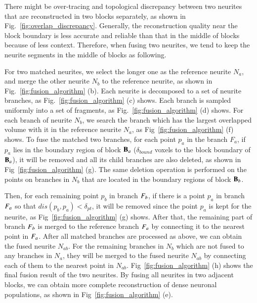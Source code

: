 There might be over-tracing and topological discrepancy between two neurites that are reconstructed in two blocks separately, as shown in Fig.~\ref{fig:overlap_discrepancy}.
Generally, the reconstruction quality near the block boundary is less accurate and reliable than that in the middle of blocks because of less context. 
Therefore, when fusing two neurites, we tend to keep the neurite segments in the middle of blocks as following. 
  
For two matched neurites, we select the longer one as the reference neurite $N_a$, and merge the other neurite $N_b$ to the reference neurite, as shown in Fig.~\ref{fig:fusion_algorithm} (b).
%
Each neurite is decomposed to a set of neurite branches, as Fig.~\ref{fig:fusion_algorithm} (c) shows.
Each branch is sampled uniformly into a set of fragments, as Fig.~\ref{fig:fusion_algorithm} (d) shows.
%
For each branch of neurite $N_b$, we search the branch which has the largest overlapped volume with it in the reference neurite $N_a$, as Fig~\ref{fig:fusion_algorithm} (f) shows.
To fuse the matched two branches, for each point $p_a$ in the branch $F_a$, if $p_a$ lies in the boundary region of block $\mathbf{B}_a$ ($\delta_{bound}$ voxels to the block boundary of $\mathbf{B}_a$), it will be removed and all its child branches are also deleted, as shown in Fig~\ref{fig:fusion_algorithm} (g).  
The same deletion operation is performed on the points on branches in $N_b$ that are located in the boundary regions of block $\mathbf{B}_b$.


Then, for each remaining point $p_b$ in branch $F_b$, if there is a point $p_a$ in branch $F_a$ so that $dis(p_b,p_a)<\delta_{pt}$, it will be removed since the point $p_a$ is kept for the neurite, as Fig~\ref{fig:fusion_algorithm} (g) shows.
%
After that, the remaining part of branch $F_b$ is merged to the reference branch $F_a$ by connecting it to the nearest point in $F_a$.
After all matched branches are processed as above, we can obtain the fused neurite $N_{ab}$.
%
For the remaining branches in $N_b$ which are not fused to any branches in $N_a$, they will be merged to the fused neurite $N_{ab}$ by connecting each of them to the nearest point in $N_{ab}$.
%
Fig~\ref{fig:fusion_algorithm} (h) shows the final fusion result of the two neurites. 
By fusing all neurites in two adjacent blocks, we can obtain more complete reconstruction of dense neuronal populations, as shown in Fig~\ref{fig:fusion_algorithm} (e).


